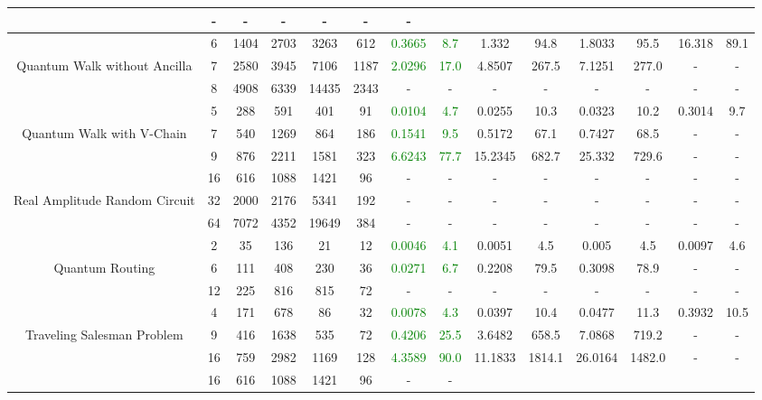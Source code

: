 \begin{table}[htb]
{\begin{tabular}{|c|c|c|c|c|c|c|c|c|c|c|c|c|c|}
 & - & -
 & - & -
 & - & -
 \\
\hline
 & 
6 & 1404 & 2703 & 3263 & 612
 & \textcolor{green}{0.3665} & \textcolor{green}{8.7}
 & 1.332 & 94.8
 & 1.8033 & 95.5
 & 16.318 & 89.1
 \\
Quantum Walk without Ancilla & 
7 & 2580 & 3945 & 7106 & 1187
 & \textcolor{green}{2.0296} & \textcolor{green}{17.0}
 & 4.8507 & 267.5
 & 7.1251 & 277.0
 & - & -
 \\
 & 
8 & 4908 & 6339 & 14435 & 2343
 & - & -
 & - & -
 & - & -
 & - & -
 \\
\hline
 & 
5 & 288 & 591 & 401 & 91
 & \textcolor{green}{0.0104} & \textcolor{green}{4.7}
 & 0.0255 & 10.3
 & 0.0323 & 10.2
 & 0.3014 & 9.7
 \\
Quantum Walk with V-Chain & 
7 & 540 & 1269 & 864 & 186
 & \textcolor{green}{0.1541} & \textcolor{green}{9.5}
 & 0.5172 & 67.1
 & 0.7427 & 68.5
 & - & -
 \\
 & 
9 & 876 & 2211 & 1581 & 323
 & \textcolor{green}{6.6243} & \textcolor{green}{77.7}
 & 15.2345 & 682.7
 & 25.332 & 729.6
 & - & -
 \\
\hline
 & 
16 & 616 & 1088 & 1421 & 96
 & - & -
 & - & -
 & - & -
 & - & -
 \\
Real Amplitude Random Circuit & 
32 & 2000 & 2176 & 5341 & 192
 & - & -
 & - & -
 & - & -
 & - & -
 \\
 & 
64 & 7072 & 4352 & 19649 & 384
 & - & -
 & - & -
 & - & -
 & - & -
 \\
\hline
 & 
2 & 35 & 136 & 21 & 12
 & \textcolor{green}{0.0046} & \textcolor{green}{4.1}
 & 0.0051 & 4.5
 & 0.005 & 4.5
 & 0.0097 & 4.6
 \\
Quantum Routing & 
6 & 111 & 408 & 230 & 36
 & \textcolor{green}{0.0271} & \textcolor{green}{6.7}
 & 0.2208 & 79.5
 & 0.3098 & 78.9
 & - & -
 \\
 & 
12 & 225 & 816 & 815 & 72
 & - & -
 & - & -
 & - & -
 & - & -
 \\
\hline
 & 
4 & 171 & 678 & 86 & 32
 & \textcolor{green}{0.0078} & \textcolor{green}{4.3}
 & 0.0397 & 10.4
 & 0.0477 & 11.3
 & 0.3932 & 10.5
 \\
Traveling Salesman Problem & 
9 & 416 & 1638 & 535 & 72
 & \textcolor{green}{0.4206} & \textcolor{green}{25.5}
 & 3.6482 & 658.5
 & 7.0868 & 719.2
 & - & -
 \\
 & 
16 & 759 & 2982 & 1169 & 128
 & \textcolor{green}{4.3589} & \textcolor{green}{90.0}
 & 11.1833 & 1814.1
 & 26.0164 & 1482.0
 & - & -
 \\
\hline
 & 
16 & 616 & 1088 & 1421 & 96
 & - & -

\end{tabular}}
\end{table}
